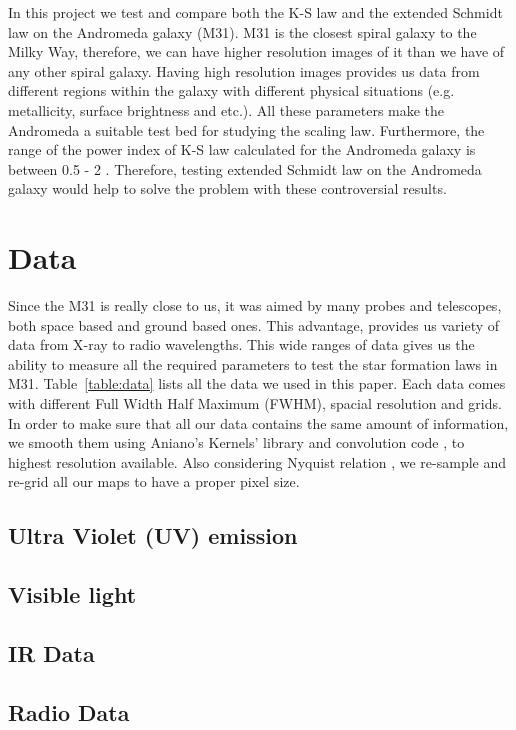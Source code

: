 \documentclass[useAMS,usenatbib]{mn2e}
\begin{document}
In this project we test and compare both the K-S law and the extended Schmidt law on the Andromeda galaxy (M31). M31 is the closest spiral galaxy to the Milky Way, therefore, we can have higher resolution images of it than we have of any other spiral galaxy. Having high resolution images provides us data from different regions within
the galaxy with different physical situations (e.g. metallicity, surface brightness and etc.). All these parameters make the Andromeda a suitable test bed for studying the scaling law.
Furthermore, the range of the power index of K-S law calculated for the Andromeda galaxy is between 0.5 - 2 \citep[e.g.,][]{Tabatabaei10,Ford13}. Therefore, testing extended Schmidt law on the Andromeda galaxy would help to solve the problem with these controversial results.


\section{Data}
\label{sec:data}
Since the M31 is really close to us, it was aimed by many probes and telescopes, both space based and ground based ones. This advantage, provides us variety of data from X-ray to radio wavelengths. This wide ranges of data gives us the ability to measure all the required parameters to test the star formation laws in M31. Table~\ref{table:data} lists all the data we used in this paper. Each data comes with different Full Width Half Maximum (FWHM), spacial resolution and grids. In order to make sure that all our data contains the same amount of information, we smooth them using Aniano's Kernels' library and convolution code \citep{Aniano12}, to highest resolution available. Also considering Nyquist relation \citep{Nyquist}, we re-sample and re-grid all our maps to have a proper pixel size.

\subsection{Ultra Violet (UV) emission}
\subsection{Visible light}
\subsection{IR Data}
\subsection{Radio Data}
\end{document}
